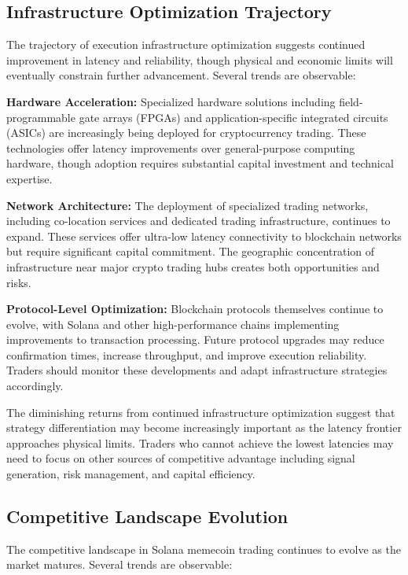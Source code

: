\documentclass[12pt,a4paper]{article}
\begin{document}
\subsection{Infrastructure Optimization Trajectory}

The trajectory of execution infrastructure optimization suggests continued improvement in latency and reliability, though physical and economic limits will eventually constrain further advancement. Several trends are observable:

\textbf{Hardware Acceleration:} Specialized hardware solutions including field-programmable gate arrays (FPGAs) and application-specific integrated circuits (ASICs) are increasingly being deployed for cryptocurrency trading. These technologies offer latency improvements over general-purpose computing hardware, though adoption requires substantial capital investment and technical expertise.

\textbf{Network Architecture:} The deployment of specialized trading networks, including co-location services and dedicated trading infrastructure, continues to expand. These services offer ultra-low latency connectivity to blockchain networks but require significant capital commitment. The geographic concentration of infrastructure near major crypto trading hubs creates both opportunities and risks.

\textbf{Protocol-Level Optimization:} Blockchain protocols themselves continue to evolve, with Solana and other high-performance chains implementing improvements to transaction processing. Future protocol upgrades may reduce confirmation times, increase throughput, and improve execution reliability. Traders should monitor these developments and adapt infrastructure strategies accordingly.

The diminishing returns from continued infrastructure optimization suggest that strategy differentiation may become increasingly important as the latency frontier approaches physical limits. Traders who cannot achieve the lowest latencies may need to focus on other sources of competitive advantage including signal generation, risk management, and capital efficiency.

\subsection{Competitive Landscape Evolution}

The competitive landscape in Solana memecoin trading continues to evolve as the market matures. Several trends are observable:
\end{document}
